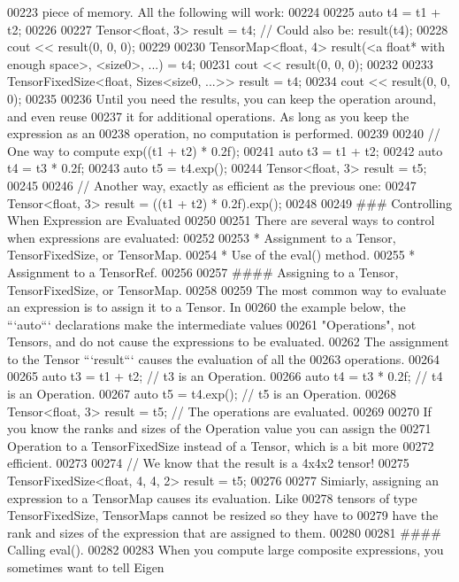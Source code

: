 \begin{DoxyCode}
00223 piece of memory.  All the following will work:
00224 
00225     auto t4 = t1 + t2;
00226 
00227     Tensor<float, 3> result = t4;  // Could also be: result(t4);
00228     cout << result(0, 0, 0);
00229 
00230     TensorMap<float, 4> result(<a float* with enough space>, <size0>, ...) = t4;
00231     cout << result(0, 0, 0);
00232 
00233     TensorFixedSize<float, Sizes<size0, ...>> result = t4;
00234     cout << result(0, 0, 0);
00235 
00236 Until you need the results, you can keep the operation around, and even reuse
00237 it for additional operations.  As long as you keep the expression as an
00238 operation, no computation is performed.
00239 
00240     // One way to compute exp((t1 + t2) * 0.2f);
00241     auto t3 = t1 + t2;
00242     auto t4 = t3 * 0.2f;
00243     auto t5 = t4.exp();
00244     Tensor<float, 3> result = t5;
00245 
00246     // Another way, exactly as efficient as the previous one:
00247     Tensor<float, 3> result = ((t1 + t2) * 0.2f).exp();
00248 
00249 ### Controlling When Expression are Evaluated
00250 
00251 There are several ways to control when expressions are evaluated:
00252 
00253 *   Assignment to a Tensor, TensorFixedSize, or TensorMap.
00254 *   Use of the eval() method.
00255 *   Assignment to a TensorRef.
00256 
00257 #### Assigning to a Tensor, TensorFixedSize, or TensorMap.
00258 
00259 The most common way to evaluate an expression is to assign it to a Tensor.  In
00260 the example below, the ```auto``` declarations make the intermediate values
00261 "Operations", not Tensors, and do not cause the expressions to be evaluated.
00262 The assignment to the Tensor ```result``` causes the evaluation of all the
00263 operations.
00264 
00265     auto t3 = t1 + t2;             // t3 is an Operation.
00266     auto t4 = t3 * 0.2f;           // t4 is an Operation.
00267     auto t5 = t4.exp();            // t5 is an Operation.
00268     Tensor<float, 3> result = t5;  // The operations are evaluated.
00269 
00270 If you know the ranks and sizes of the Operation value you can assign the
00271 Operation to a TensorFixedSize instead of a Tensor, which is a bit more
00272 efficient.
00273 
00274     // We know that the result is a 4x4x2 tensor!
00275     TensorFixedSize<float, 4, 4, 2> result = t5;
00276 
00277 Simiarly, assigning an expression to a TensorMap causes its evaluation.  Like
00278 tensors of type TensorFixedSize, TensorMaps cannot be resized so they have to
00279 have the rank and sizes of the expression that are assigned to them.
00280 
00281 #### Calling eval().
00282 
00283 When you compute large composite expressions, you sometimes want to tell Eigen

\end{DoxyCode}
